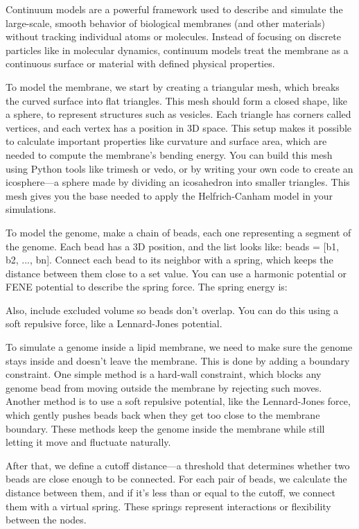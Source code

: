 \documentclass[12pt]{article}
\begin{document}
\begin{flushleft}
Continuum models are a powerful framework used to describe and simulate the large-scale, smooth behavior of biological membranes (and other materials) without tracking individual atoms or molecules. Instead of focusing on discrete particles like in molecular dynamics, continuum models treat the membrane as a continuous surface or material with defined physical properties.

To model the membrane, we start by creating a triangular mesh, which breaks the curved surface into flat triangles. This mesh should form a closed shape, like a sphere, to represent structures such as vesicles. Each triangle has corners called vertices, and each vertex has a position in 3D space. This setup makes it possible to calculate important properties like curvature and surface area, which are needed to compute the membrane’s bending energy. You can build this mesh using Python tools like trimesh or vedo, or by writing your own code to create an icosphere—a sphere made by dividing an icosahedron into smaller triangles. This mesh gives you the base needed to apply the Helfrich-Canham model in your simulations.

To model the genome, make a chain of beads, each one representing a segment of the genome. Each bead has a 3D position, and the list looks like: beads = [b1, b2, ..., bn]. Connect each bead to its neighbor with a spring, which keeps the distance between them close to a set value. You can use a harmonic potential or FENE potential to describe the spring force. The spring energy is:






Also, include excluded volume so beads don’t overlap. You can do this using a soft repulsive force, like a Lennard-Jones potential.


To simulate a genome inside a lipid membrane, we need to make sure the genome stays inside and doesn’t leave the membrane. This is done by adding a boundary constraint. One simple method is a hard-wall constraint, which blocks any genome bead from moving outside the membrane by rejecting such moves. Another method is to use a soft repulsive potential, like the Lennard-Jones force, which gently pushes beads back when they get too close to the membrane boundary. These methods keep the genome inside the membrane while still letting it move and fluctuate naturally.


 
 
 
 
  After that, we define a cutoff distance—a threshold that determines whether two beads are close enough to be connected. For each pair of beads, we calculate the distance between them, and if it’s less than or equal to the cutoff, we connect them with a virtual spring. These springs represent interactions or flexibility between the nodes. 
  

\end{flushleft}
\end{document}
